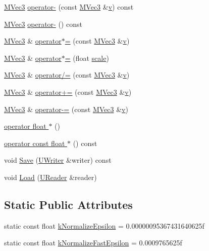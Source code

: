 \begin{CompactItemize}
\item 
\hyperlink{class_m_vec3}{MVec3} \hyperlink{class_m_vec3_364ae43af58e96a12cb1918dd440b035}{operator-} (const \hyperlink{class_m_vec3}{MVec3} \&\hyperlink{glext__bak_8h_5cf89b94f7478c0ebc4429b60e7ef93b}{v}) const 
\item 
\hyperlink{class_m_vec3}{MVec3} \hyperlink{class_m_vec3_e1cbaf41190a9fb28e2d63d310f8db90}{operator-} () const 
\item 
\hyperlink{class_m_vec3}{MVec3} \& \hyperlink{class_m_vec3_88ce58e51baa98ce4be1afd487bb2bda}{operator$\ast$=} (const \hyperlink{class_m_vec3}{MVec3} \&\hyperlink{glext__bak_8h_5cf89b94f7478c0ebc4429b60e7ef93b}{v})
\item 
\hyperlink{class_m_vec3}{MVec3} \& \hyperlink{class_m_vec3_94b97a8516184efd04adb35d3407c3ff}{operator$\ast$=} (float \hyperlink{glext__bak_8h_281421b881aa7a1266842b73a3bc7655}{scale})
\item 
\hyperlink{class_m_vec3}{MVec3} \& \hyperlink{class_m_vec3_f60ff7a4c15b85de98d78cc47fc6f2ff}{operator/=} (const \hyperlink{class_m_vec3}{MVec3} \&\hyperlink{glext__bak_8h_5cf89b94f7478c0ebc4429b60e7ef93b}{v})
\item 
\hyperlink{class_m_vec3}{MVec3} \& \hyperlink{class_m_vec3_d688f01e40c823692a7adc0f57df47a2}{operator+=} (const \hyperlink{class_m_vec3}{MVec3} \&\hyperlink{glext__bak_8h_5cf89b94f7478c0ebc4429b60e7ef93b}{v})
\item 
\hyperlink{class_m_vec3}{MVec3} \& \hyperlink{class_m_vec3_f4ae4ae49dce1fc340d4f13ca714a360}{operator-=} (const \hyperlink{class_m_vec3}{MVec3} \&\hyperlink{glext__bak_8h_5cf89b94f7478c0ebc4429b60e7ef93b}{v})
\item 
\hyperlink{class_m_vec3_51778c9e74564580936411dbef21c011}{operator float $\ast$} ()
\item 
\hyperlink{class_m_vec3_d8f0366391c63237816895f9892c9f29}{operator const float $\ast$} () const 
\item 
void \hyperlink{class_m_vec3_6ed278b7804ea2eeb0f058a4534010e9}{Save} (\hyperlink{class_u_writer}{UWriter} \&writer) const 
\item 
void \hyperlink{class_m_vec3_8f6e9444531a6da0042b47780dd21cbb}{Load} (\hyperlink{class_u_reader}{UReader} \&reader)
\end{CompactItemize}
\subsection*{Static Public Attributes}
\begin{CompactItemize}
\item 
static const float \hyperlink{class_m_vec3_fe4df239e5cc14ba66ccdc907bff32c6}{kNormalizeEpsilon} = 0.00000095367431640625f
\item 
static const float \hyperlink{class_m_vec3_1d3f4b88e43530acdf3733e50b858d41}{kNormalizeFastEpsilon} = 0.0009765625f
\end{CompactItemize}
